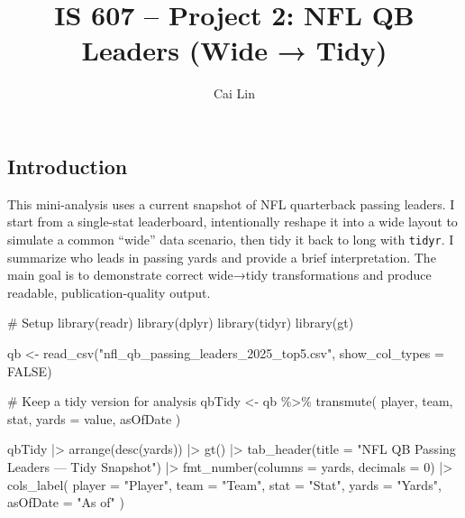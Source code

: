 \documentclass[
  letterpaper,
  DIV=11,
  numbers=noendperiod]{scrartcl}
\title{IS 607 -- Project 2: NFL QB Leaders (Wide → Tidy)}
\author{Cai Lin}
\date{}
\newenvironment{Shaded}{\begin{snugshade}}{\end{snugshade}}
\newcommand{\AttributeTok}[1]{\textcolor[rgb]{0.40,0.45,0.13}{#1}}
\newcommand{\CommentTok}[1]{\textcolor[rgb]{0.37,0.37,0.37}{#1}}
\newcommand{\ConstantTok}[1]{\textcolor[rgb]{0.56,0.35,0.01}{#1}}
\newcommand{\DecValTok}[1]{\textcolor[rgb]{0.68,0.00,0.00}{#1}}
\newcommand{\FunctionTok}[1]{\textcolor[rgb]{0.28,0.35,0.67}{#1}}
\newcommand{\NormalTok}[1]{\textcolor[rgb]{0.00,0.23,0.31}{#1}}
\newcommand{\OtherTok}[1]{\textcolor[rgb]{0.00,0.23,0.31}{#1}}
\newcommand{\SpecialCharTok}[1]{\textcolor[rgb]{0.37,0.37,0.37}{#1}}
\newcommand{\StringTok}[1]{\textcolor[rgb]{0.13,0.47,0.30}{#1}}
\begin{document}
\maketitle


\subsection{Introduction}\label{introduction}

This mini-analysis uses a current snapshot of NFL quarterback passing
leaders. I start from a single-stat leaderboard, intentionally reshape
it into a wide layout to simulate a common ``wide'' data scenario, then
tidy it back to long with \texttt{tidyr}. I summarize who leads in
passing yards and provide a brief interpretation. The main goal is to
demonstrate correct wide→tidy transformations and produce readable,
publication-quality output.

\begin{Shaded}
\begin{Highlighting}[]
\CommentTok{\# Setup}
\FunctionTok{library}\NormalTok{(readr)}
\FunctionTok{library}\NormalTok{(dplyr)}
\FunctionTok{library}\NormalTok{(tidyr)}
\FunctionTok{library}\NormalTok{(gt)}

\NormalTok{qb }\OtherTok{\textless{}{-}} \FunctionTok{read\_csv}\NormalTok{(}\StringTok{"nfl\_qb\_passing\_leaders\_2025\_top5.csv"}\NormalTok{, }\AttributeTok{show\_col\_types =} \ConstantTok{FALSE}\NormalTok{)}

\CommentTok{\# Keep a tidy version for analysis}
\NormalTok{qbTidy }\OtherTok{\textless{}{-}}\NormalTok{ qb }\SpecialCharTok{\%\textgreater{}\%}
  \FunctionTok{transmute}\NormalTok{(}
\NormalTok{    player,}
\NormalTok{    team,}
\NormalTok{    stat,}
    \AttributeTok{yards =}\NormalTok{ value,}
\NormalTok{    asOfDate}
\NormalTok{  )}

\NormalTok{qbTidy }\SpecialCharTok{|\textgreater{}}
  \FunctionTok{arrange}\NormalTok{(}\FunctionTok{desc}\NormalTok{(yards)) }\SpecialCharTok{|\textgreater{}}
  \FunctionTok{gt}\NormalTok{() }\SpecialCharTok{|\textgreater{}}
  \FunctionTok{tab\_header}\NormalTok{(}\AttributeTok{title =} \StringTok{"NFL QB Passing Leaders — Tidy Snapshot"}\NormalTok{) }\SpecialCharTok{|\textgreater{}}
  \FunctionTok{fmt\_number}\NormalTok{(}\AttributeTok{columns =}\NormalTok{ yards, }\AttributeTok{decimals =} \DecValTok{0}\NormalTok{) }\SpecialCharTok{|\textgreater{}}
  \FunctionTok{cols\_label}\NormalTok{(}
    \AttributeTok{player =} \StringTok{"Player"}\NormalTok{,}
    \AttributeTok{team =} \StringTok{"Team"}\NormalTok{,}
    \AttributeTok{stat =} \StringTok{"Stat"}\NormalTok{,}
    \AttributeTok{yards =} \StringTok{"Yards"}\NormalTok{,}
    \AttributeTok{asOfDate =} \StringTok{"As of"}
\NormalTok{  )}
\end{Highlighting}
\end{Shaded}
\end{document}
